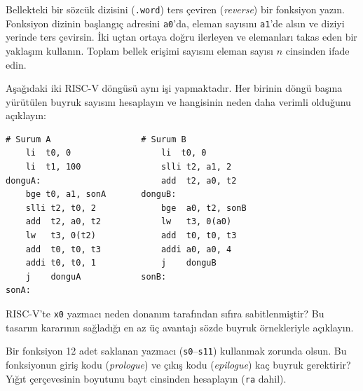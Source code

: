 \begin{alistirma}[\zor]
Bellekteki bir sözcük dizisini (\texttt{.word}) ters çeviren (\emph{reverse}) bir fonksiyon yazın. Fonksiyon dizinin başlangıç adresini \texttt{a0}'da, eleman sayısını \texttt{a1}'de alsın ve diziyi yerinde ters çevirsin. İki uçtan ortaya doğru ilerleyen ve elemanları takas eden bir yaklaşım kullanın. Toplam bellek erişimi sayısını eleman sayısı $n$ cinsinden ifade edin.
\end{alistirma}

\begin{alistirma}[\zor]
Aşağıdaki iki RISC-V döngüsü aynı işi yapmaktadır. Her birinin döngü başına yürütülen buyruk sayısını hesaplayın ve hangisinin neden daha verimli olduğunu açıklayın:
\begin{lstlisting}[style=riscv]
# Surum A                  # Surum B
    li  t0, 0                  li  t0, 0
    li  t1, 100                slli t2, a1, 2
donguA:                        add  t2, a0, t2
    bge t0, a1, sonA       donguB:
    slli t2, t0, 2             bge  a0, t2, sonB
    add  t2, a0, t2            lw   t3, 0(a0)
    lw   t3, 0(t2)             add  t0, t0, t3
    add  t0, t0, t3            addi a0, a0, 4
    addi t0, t0, 1             j    donguB
    j    donguA            sonB:
sonA:
\end{lstlisting}
\end{alistirma}

\begin{alistirma}[\kolay]
RISC-V'te \texttt{x0} yazmacı neden donanım tarafından sıfıra sabitlenmiştir? Bu tasarım kararının sağladığı en az üç avantajı sözde buyruk örnekleriyle açıklayın.
\end{alistirma}

\begin{alistirma}[\orta]
Bir fonksiyon 12 adet saklanan yazmacı (\texttt{s0}--\texttt{s11}) kullanmak zorunda olsun. Bu fonksiyonun giriş kodu (\emph{prologue}) ve çıkış kodu (\emph{epilogue}) kaç buyruk gerektirir? Yığıt çerçevesinin boyutunu bayt cinsinden hesaplayın (\texttt{ra} dahil).
\end{alistirma}
